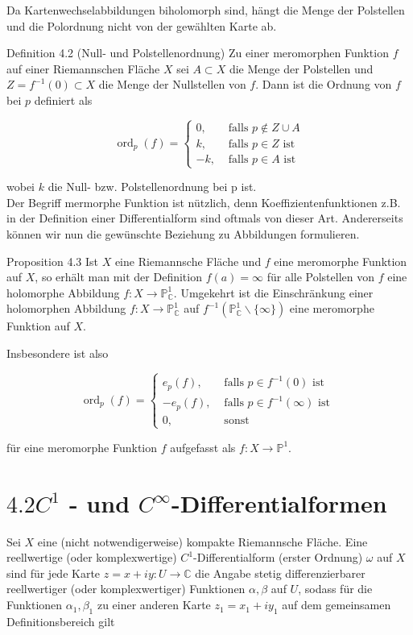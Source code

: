 \documentclass[10pt, letterpaper]{article}
\begin{document}
Da Kartenwechselabbildungen biholomorph sind, hängt die Menge der Polstellen und die Polordnung nicht von der gewählten Karte ab.

Definition 4.2 (Null- und Polstellenordnung) Zu einer meromorphen Funktion $f$ auf einer Riemannschen Fläche $X$ sei $A \subset X$ die Menge der Polstellen und $Z= f^{-1}(0) \subset X$ die Menge der Nullstellen von $f$. Dann ist die Ordnung von $f$ bei $p$ definiert als

$$
\operatorname{ord}_{p}(f)= \begin{cases}0, & \text { falls } p \notin Z \cup A \\ k, & \text { falls } p \in Z \text { ist } \\ -k, & \text { falls } p \in A \text { ist }\end{cases}
$$

wobei $k$ die Null- bzw. Polstellenordnung bei p ist.\\
Der Begriff mermorphe Funktion ist nützlich, denn Koeffizientenfunktionen z.B. in der Definition einer Differentialform sind oftmals von dieser Art. Andererseits können wir nun die gewünschte Beziehung zu Abbildungen formulieren.

Proposition 4.3 Ist $X$ eine Riemannsche Fläche und $f$ eine meromorphe Funktion auf $X$, so erhält man mit der Definition $f(a)=\infty$ für alle Polstellen von $f$ eine holomorphe Abbildung $f: X \rightarrow \mathbb{P}_{\mathbb{C}}^{1}$. Umgekehrt ist die Einschränkung einer holomorphen Abbildung $f: X \rightarrow \mathbb{P}_{\mathbb{C}}^{1}$ auf $f^{-1}\left(\mathbb{P}_{\mathbb{C}}^{1} \backslash\{\infty\}\right)$ eine meromorphe Funktion auf $X$.

Insbesondere ist also

$$
\operatorname{ord}_{p}(f)= \begin{cases}e_{p}(f), & \text { falls } p \in f^{-1}(0) \text { ist } \\ -e_{p}(f), & \text { falls } p \in f^{-1}(\infty) \text { ist } \\ 0, & \text { sonst }\end{cases}
$$

für eine meromorphe Funktion $f$ aufgefasst als $f: X \rightarrow \mathbb{P}^{1}$.

\section {$4.2 C^{1}$ - und $C^{\infty}$-Differentialformen}

Sei $X$ eine (nicht notwendigerweise) kompakte Riemannsche Fläche. Eine reellwertige (oder komplexwertige) $C^{1}$-Differentialform (erster Ordnung) $\omega$ auf $X$ sind für jede Karte $z=x+i y: U \rightarrow \mathbb{C}$ die Angabe stetig differenzierbarer reellwertiger (oder komplexwertiger) Funktionen $\alpha, \beta$ auf $U$, sodass für die Funktionen $\alpha_{1}, \beta_{1}$ zu einer anderen Karte $z_{1}=x_{1}+i y_{1}$ auf dem gemeinsamen Definitionsbereich gilt
\end{document}
